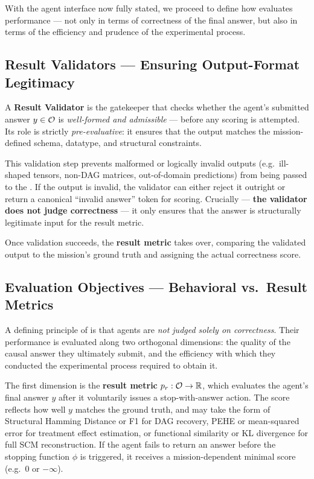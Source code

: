 With the agent interface now fully stated, we proceed to define how \game evaluates performance — not only in terms of correctness of the final answer, but also in terms of the efficiency and prudence of the experimental process.

\subsection{Result Validators — Ensuring Output-Format Legitimacy}
A \textbf{Result Validator} is the gatekeeper that checks whether the agent’s submitted answer $y \in \outputspace$ is \emph{well-formed and admissible} — before any scoring is attempted. Its role is strictly \emph{pre-evaluative}: it ensures that the output matches the mission-defined schema, datatype, and structural constraints.

This validation step prevents malformed or logically invalid outputs (e.g.\ ill-shaped tensors, non-DAG matrices, out-of-domain predictions) from being passed to the \resultmetric. If the output is invalid, the validator can either reject it outright or return a canonical “invalid answer” token for scoring. Crucially — \textbf{the validator does not judge correctness} — it only ensures that the answer is structurally legitimate input for the result metric.

Once validation succeeds, the \textbf{result metric} takes over, comparing the validated output to the mission’s ground truth and assigning the actual correctness score.

\subsection{Evaluation Objectives — Behavioral vs.\ Result Metrics}
\label{sec:eval:metrics}
A defining principle of \game is that agents are \emph{not judged solely on correctness}. Their performance is evaluated along two orthogonal dimensions: the quality of the causal answer they ultimately submit, and the efficiency with which they conducted the experimental process required to obtain it.

The first dimension is the \textbf{result metric} $\resultmetric : \outputspace \rightarrow \mathbb{R}$, which evaluates the agent’s final answer $y$ after it voluntarily issues a stop-with-answer action. The score reflects how well $y$ matches the ground truth, and may take the form of Structural Hamming Distance or F1 for DAG recovery, PEHE or mean-squared error for treatment effect estimation, or functional similarity or KL divergence for full SCM reconstruction. If the agent fails to return an answer before the stopping function $\phi$ is triggered, it receives a mission-dependent minimal score (e.g.\ $0$ or $-\infty$).


